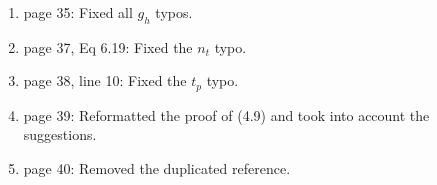 \documentclass[12pt]{article}%
\theoremstyle{plain}
\theoremstyle{definition}
\def\R{\mathbb{R}}
\newcommand{\Norm}[1]{\left|\left|  #1   \right|\right|}
\numberwithin{equation}{section}
\begin{document}
\begin{enumerate}
  \item[73.] page 35: Fixed all $g_h$ typos.
  \item[74.] page 37, Eq 6.19: Fixed the $n_t$ typo.
  \item[75.] page 38, line 10: Fixed the $t_p$ typo.

  \item[76.] page 39: Reformatted the proof of (4.9) and took into account the
    suggestions.
  \item[77.] page 40: Removed the duplicated reference.
\end{enumerate}

%
%
\end{document}
